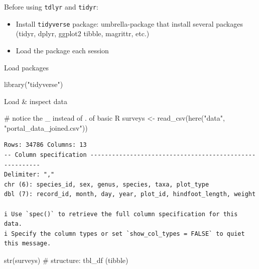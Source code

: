 \documentclass[
  letterpaper,
  DIV=11,
  numbers=noendperiod]{scrreprt}
\newenvironment{Shaded}{\begin{snugshade}}{\end{snugshade}}
\newcommand{\CommentTok}[1]{\textcolor[rgb]{0.37,0.37,0.37}{#1}}
\newcommand{\FunctionTok}[1]{\textcolor[rgb]{0.28,0.35,0.67}{#1}}
\newcommand{\NormalTok}[1]{\textcolor[rgb]{0.00,0.23,0.31}{#1}}
\newcommand{\OtherTok}[1]{\textcolor[rgb]{0.00,0.23,0.31}{#1}}
\newcommand{\StringTok}[1]{\textcolor[rgb]{0.13,0.47,0.30}{#1}}
\providecommand{\tightlist}{%
  \setlength{\itemsep}{0pt}\setlength{\parskip}{0pt}}\usepackage{longtable,booktabs,array}
\begin{document}
Before using \texttt{tdlyr} and \texttt{tidyr}:

\begin{itemize}
\tightlist
\item
  Install \texttt{tidyverse} package: umbrella-package that install
  several packages (tidyr, dplyr, ggplot2 tibble, magrittr, etc.)
\item
  Load the package each session
\end{itemize}

Load packages

\begin{Shaded}
\begin{Highlighting}[]
\FunctionTok{library}\NormalTok{(}\StringTok{"tidyverse"}\NormalTok{)}
\end{Highlighting}
\end{Shaded}

Load \& inspect data

\begin{Shaded}
\begin{Highlighting}[]
\CommentTok{\# notice the \textquotesingle{}\_\textquotesingle{} instead of \textquotesingle{}.\textquotesingle{} of basic R}
\NormalTok{surveys }\OtherTok{\textless{}{-}} \FunctionTok{read\_csv}\NormalTok{(}\FunctionTok{here}\NormalTok{(}\StringTok{"data"}\NormalTok{, }\StringTok{"portal\_data\_joined.csv"}\NormalTok{))}
\end{Highlighting}
\end{Shaded}

\begin{verbatim}
Rows: 34786 Columns: 13
-- Column specification --------------------------------------------------------
Delimiter: ","
chr (6): species_id, sex, genus, species, taxa, plot_type
dbl (7): record_id, month, day, year, plot_id, hindfoot_length, weight

i Use `spec()` to retrieve the full column specification for this data.
i Specify the column types or set `show_col_types = FALSE` to quiet this message.
\end{verbatim}

\begin{Shaded}
\begin{Highlighting}[]
\FunctionTok{str}\NormalTok{(surveys) }\CommentTok{\# structure: tbl\_df (tibble)}
\end{Highlighting}
\end{Shaded}
\end{document}
